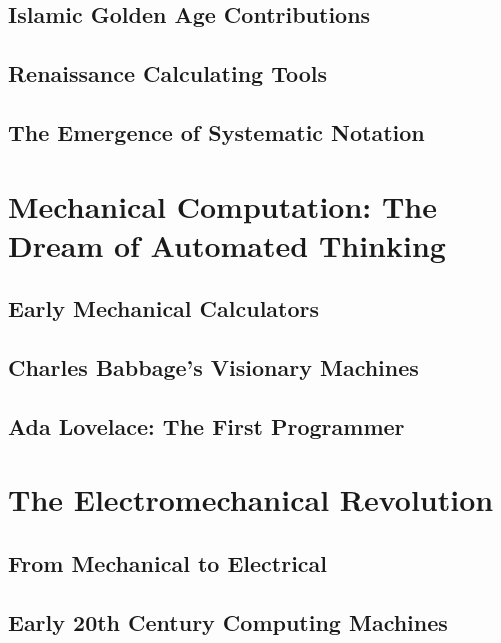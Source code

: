 \documentclass[12pt, oneside, openany]{book}
\begin{document}
\section{Islamic Golden Age Contributions}

\section{Renaissance Calculating Tools}

\section{The Emergence of Systematic Notation}


\chapter{Mechanical Computation: The Dream of Automated Thinking}

\section{Early Mechanical Calculators}

\section{Charles Babbage's Visionary Machines}

\section{Ada Lovelace: The First Programmer}


\chapter{The Electromechanical Revolution}

\section{From Mechanical to Electrical}

\section{Early 20th Century Computing Machines}
\end{document}
